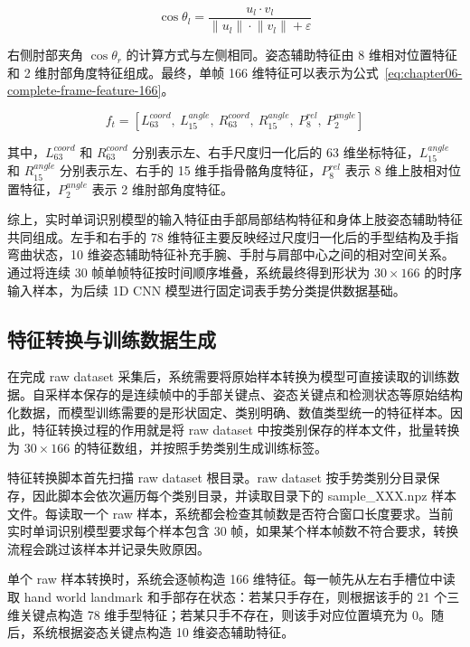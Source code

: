 \begin{equation}
\cos\theta_l = \frac{u_l \cdot v_l}{\lVert u_l\rVert \cdot \lVert v_l\rVert + \varepsilon}
\label{eq:chapter06-left-elbow-angle-cosine}
\end{equation}

右侧肘部夹角 $\cos\theta_r$ 的计算方式与左侧相同。姿态辅助特征由 8 维相对位置特征和 2 维肘部角度特征组成。最终，单帧 166 维特征可以表示为公式~\ref{eq:chapter06-complete-frame-feature-166}。

\begin{equation}
f_t = [L^{coord}_{63},\ L^{angle}_{15},\ R^{coord}_{63},\ R^{angle}_{15},\ P^{rel}_{8},\ P^{angle}_{2}]
\label{eq:chapter06-complete-frame-feature-166}
\end{equation}

其中，$L^{coord}_{63}$ 和 $R^{coord}_{63}$ 分别表示左、右手尺度归一化后的 63 维坐标特征，$L^{angle}_{15}$ 和 $R^{angle}_{15}$ 分别表示左、右手的 15 维手指骨骼角度特征，$P^{rel}_{8}$ 表示 8 维上肢相对位置特征，$P^{angle}_{2}$ 表示 2 维肘部角度特征。

综上，实时单词识别模型的输入特征由手部局部结构特征和身体上肢姿态辅助特征共同组成。左手和右手的 78 维特征主要反映经过尺度归一化后的手型结构及手指弯曲状态，10 维姿态辅助特征补充手腕、手肘与肩部中心之间的相对空间关系。通过将连续 30 帧单帧特征按时间顺序堆叠，系统最终得到形状为 $30\times166$ 的时序输入样本，为后续 1D CNN 模型进行固定词表手势分类提供数据基础。

\subsection{特征转换与训练数据生成}

在完成 raw dataset 采集后，系统需要将原始样本转换为模型可直接读取的训练数据。自采样本保存的是连续帧中的手部关键点、姿态关键点和检测状态等原始结构化数据，而模型训练需要的是形状固定、类别明确、数值类型统一的特征样本。因此，特征转换过程的作用就是将 raw dataset 中按类别保存的样本文件，批量转换为 $30\times166$ 的特征数组，并按照手势类别生成训练标签。

特征转换脚本首先扫描 raw dataset 根目录。raw dataset 按手势类别分目录保存，因此脚本会依次遍历每个类别目录，并读取目录下的 sample\_XXX.npz 样本文件。每读取一个 raw 样本，系统都会检查其帧数是否符合窗口长度要求。当前实时单词识别模型要求每个样本包含 30 帧，如果某个样本帧数不符合要求，转换流程会跳过该样本并记录失败原因。

单个 raw 样本转换时，系统会逐帧构造 166 维特征。每一帧先从左右手槽位中读取 hand world landmark 和手部存在状态：若某只手存在，则根据该手的 21 个三维关键点构造 78 维手型特征；若某只手不存在，则该手对应位置填充为 0。随后，系统根据姿态关键点构造 10 维姿态辅助特征。

